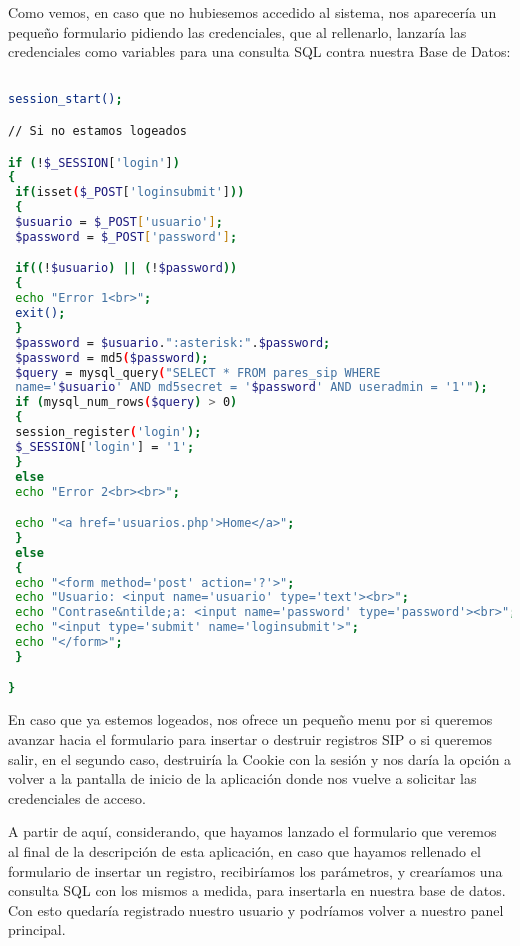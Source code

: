 Como vemos, en caso que no hubiesemos accedido al sistema, nos aparecería un pequeño formulario pidiendo las credenciales, que al rellenarlo, lanzaría las credenciales como variables para una consulta SQL contra nuestra Base de Datos:

\begin{lstlisting}[language=bash,title={./www/usuarios.php}]

session_start();

// Si no estamos logeados

if (!$_SESSION['login'])
{
 if(isset($_POST['loginsubmit']))
 {
 $usuario = $_POST['usuario'];
 $password = $_POST['password'];

 if((!$usuario) || (!$password))
 {
 echo "Error 1<br>";
 exit();
 }
 $password = $usuario.":asterisk:".$password;
 $password = md5($password);
 $query = mysql_query("SELECT * FROM pares_sip WHERE 
 name='$usuario' AND md5secret = '$password' AND useradmin = '1'");
 if (mysql_num_rows($query) > 0)
 {
 session_register('login');
 $_SESSION['login'] = '1';
 }
 else
 echo "Error 2<br><br>";

 echo "<a href='usuarios.php'>Home</a>";
 }
 else
 {
 echo "<form method='post' action='?'>";
 echo "Usuario: <input name='usuario' type='text'><br>";
 echo "Contrase&ntilde;a: <input name='password' type='password'><br>";
 echo "<input type='submit' name='loginsubmit'>";
 echo "</form>";
 }

}

\end{lstlisting}

En caso que ya estemos logeados, nos ofrece un pequeño menu por si queremos avanzar hacia el formulario para insertar o destruir registros SIP o si queremos salir, en el segundo caso, destruiría la Cookie con la sesión y nos daría la opción a volver a la pantalla de inicio de la aplicación donde nos vuelve a solicitar las credenciales de acceso.

A partir de aquí, considerando, que hayamos lanzado el formulario que veremos al final de la descripción de esta aplicación, en caso que hayamos rellenado el formulario de insertar un registro, recibiríamos los parámetros, y crearíamos una consulta SQL con los mismos a medida, para insertarla en nuestra base de datos. Con esto quedaría registrado nuestro usuario y podríamos volver a nuestro panel principal.

